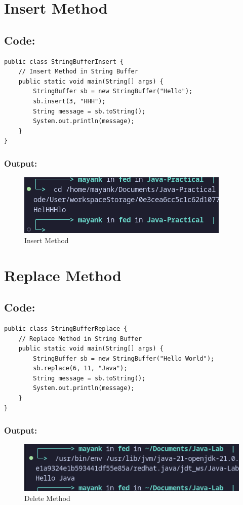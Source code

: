 \documentclass[a4paper,12pt]{article}
\begin{document}
\section{Insert Method}
\subsection{Code:}
\begin{lstlisting}
public class StringBufferInsert {
    // Insert Method in String Buffer
    public static void main(String[] args) {
        StringBuffer sb = new StringBuffer("Hello");
        sb.insert(3, "HHH");
        String message = sb.toString();
        System.out.println(message);
    }
}
\end{lstlisting}

\subsubsection{Output:}
\begin{figure}[H]
    \centering
    \includegraphics[width=0.8\linewidth]{images/42.png}
    \caption{Insert Method}
\end{figure}

\section{Replace Method}
\subsection{Code:}
\begin{lstlisting}
public class StringBufferReplace {
    // Replace Method in String Buffer
    public static void main(String[] args) {
        StringBuffer sb = new StringBuffer("Hello World");
        sb.replace(6, 11, "Java");
        String message = sb.toString();
        System.out.println(message);
    }
}
\end{lstlisting}
\subsubsection{Output:}
\begin{figure}[H]
    \centering
    \includegraphics[width=0.8\linewidth]{images/replace.png}
    \caption{Delete Method}
\end{figure}
\end{document}
